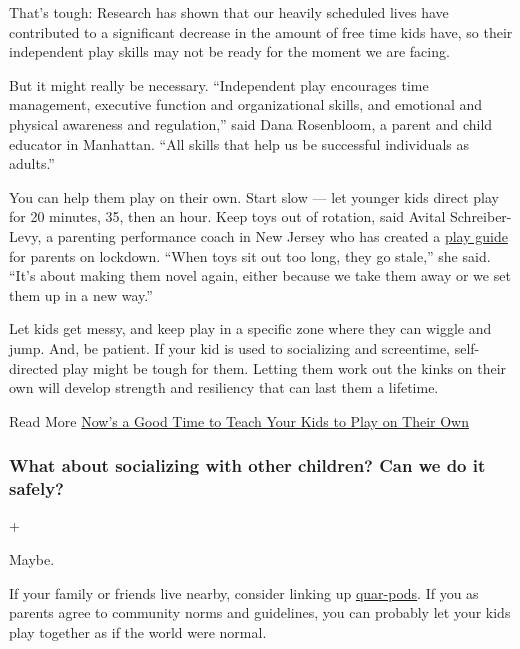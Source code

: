 That's tough: Research has shown that our heavily scheduled lives have
contributed to a significant decrease in the amount of free time kids
have, so their independent play skills may not be ready for the moment
we are facing.

But it might really be necessary. ``Independent play encourages time
management, executive function and organizational skills, and emotional
and physical awareness and regulation,'' said Dana Rosenbloom, a parent
and child educator in Manhattan. ``All skills that help us be successful
individuals as adults.''

You can help them play on their own. Start slow --- let younger kids
direct play for 20 minutes, 35, then an hour. Keep toys out of rotation,
said Avital Schreiber-Levy, a parenting performance coach in New Jersey
who has created a
\href{https://www.theparentingjunkie.com/wp-content/uploads/2020/03/PlayPandemic-Newer.pdf}{play
guide} for parents on lockdown. ``When toys sit out too long, they go
stale,'' she said. ``It's about making them novel again, either because
we take them away or we set them up in a new way.''

Let kids get messy, and keep play in a specific zone where they can
wiggle and jump. And, be patient. If your kid is used to socializing and
screentime, self-directed play might be tough for them. Letting them
work out the kinks on their own will develop strength and resiliency
that can last them a lifetime.

Read More
\href{https://www.nytimes3xbfgragh.onion/2020/04/03/parenting/kids-independent-play-coronavirus-quarantine.html}{Now's
a Good Time to Teach Your Kids to Play on Their Own}

\hypertarget{what-about-socializing-with-other-children-can-we-do-it-safely}{%
\subsubsection{What about socializing with other children? Can we do it
safely?}\label{what-about-socializing-with-other-children-can-we-do-it-safely}}

+

Maybe.

If your family or friends live nearby, consider linking up
\href{https://www.nytimes3xbfgragh.onion/2020/06/09/parenting/coronavirus-pod-family.html}{quar-pods}.
If you as parents agree to community norms and guidelines, you can
probably let your kids play together as if the world were normal.

